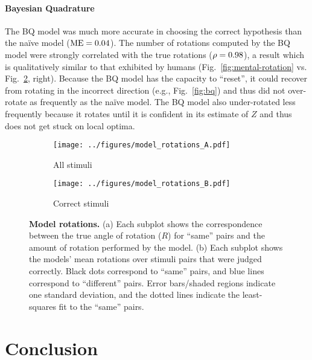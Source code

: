 \documentclass{article} %
\newcommand{\naive}[0]{na\"ive}
\begin{document}
\paragraph{Bayesian Quadrature}

The BQ model was much more accurate in choosing the correct hypothesis
than the \naive{} model ($\mathrm{ME}{}=0.04{}$). The number of rotations computed
by the BQ model were strongly correlated with the true rotations
($\rho=0.98$), a result which is qualitatively similar to that exhibited
by humans (Fig.~\ref{fig:mental-rotation}
vs. Fig.~\ref{fig:correct-stimuli}, right). Because the BQ model has
the capacity to ``reset'', it could recover from rotating in the
incorrect direction (e.g., Fig.~\ref{fig:bq}) and thus did not
over-rotate as frequently as the \naive{} model.  The BQ model also
under-rotated less frequently because it rotates until it is confident
in its estimate of $Z$ and thus does not get stuck on local optima.

\begin{figure}[t]
  \centering
  \begin{subfigure}[b]{0.49\textwidth}
    \centering
    \texttt{[image: ../figures/model\_rotations\_A.pdf]}
    \caption{All stimuli}
    \label{fig:all-stimuli}
  \end{subfigure}
  \begin{subfigure}[b]{0.49\textwidth}
    \centering
    \texttt{[image: ../figures/model\_rotations\_B.pdf]}
    \caption{Correct stimuli}
    \label{fig:correct-stimuli}
  \end{subfigure}
  \caption{\textbf{Model rotations.} (a) Each subplot shows the
    correspondence between the true angle of rotation ($R$) for
    ``same'' pairs and the amount of rotation performed by the
    model. (b) Each subplot shows the models' mean rotations over
    stimuli pairs that were judged correctly. Black dots correspond to
    ``same'' pairs, and blue lines correspond to ``different''
    pairs. Error bars/shaded regions indicate one standard deviation,
    and the dotted lines indicate the least-squares fit to the
    ``same'' pairs.}
  \label{fig:rotations}
\end{figure}


\section{Conclusion}
\end{document}
